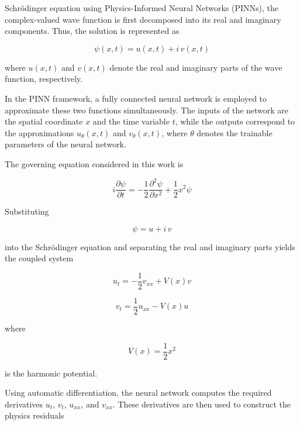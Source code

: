 \documentclass[11pt]{article}
\begin{document}
Schrödinger equation using Physics-Informed 
Neural Networks (PINNs), 
the complex-valued wave function is first decomposed into its real and imaginary components. 
Thus, the solution is represented as

\begin{equation}
	\psi(x,t)=u(x,t)+i\,v(x,t)
\end{equation}

where $u(x,t)$ and $v(x,t)$ denote the real and imaginary parts of the wave function, respectively.

In the PINN framework, a fully connected neural network is employed to approximate these two functions simultaneously. The inputs of the network are the spatial coordinate $x$ and the time variable $t$, while the outputs correspond to the approximations $u_\theta(x,t)$ and $v_\theta(x,t)$, where $\theta$ denotes the trainable parameters of the neural network.

The governing equation considered in this work is

\begin{equation}
	i\frac{\partial \psi}{\partial t}
	=
	-\frac{1}{2}\frac{\partial^2\psi}{\partial x^2}
	+
	\frac{1}{2}x^2\psi
	\label{eq:schrodinger}
\end{equation}

Substituting

\begin{equation}
	\psi=u+i\,v
\end{equation}

into the Schrödinger equation and separating the real and imaginary parts yields the coupled system

\begin{equation}
	u_t
	=
	-\frac{1}{2}v_{xx}
	+
	V(x)v
\end{equation}

\begin{equation}
	v_t
	=
	\frac{1}{2}u_{xx}
	-
	V(x)u
\end{equation}

where

\begin{equation}
	V(x)=\frac{1}{2}x^2
\end{equation}

is the harmonic potential.

Using automatic differentiation, the neural network computes the required derivatives $u_t$, $v_t$, $u_{xx}$, and $v_{xx}$. These derivatives are then used to construct the physics residuals
\end{document}
